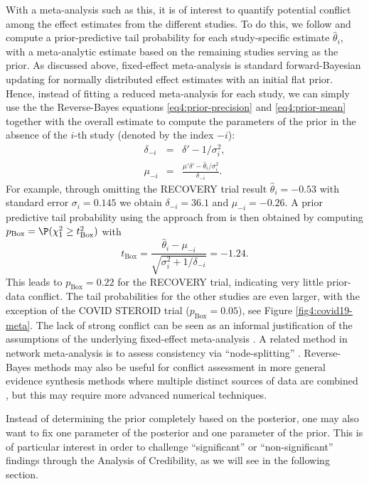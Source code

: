 With a meta-analysis such as this, it is of interest to quantify potential
conflict among the effect estimates from the different studies. To do this, we
follow \citet{Presanis2013} and compute a prior-predictive tail probability
\citep{Box1980, Evans2006} for each study-specific estimate $\hat \theta_i$,
with a meta-analytic estimate based on the remaining studies serving as the
prior. As discussed above, fixed-effect meta-analysis is standard
forward-Bayesian updating for normally distributed effect estimates with an
initial flat prior. Hence, instead of fitting a reduced meta-analysis for each
study, we can simply use the the Reverse-Bayes equations
\eqref{eq4:prior-precision} and \eqref{eq4:prior-mean} together with the overall
estimate to compute the parameters of the prior in the absence of the $i$-th
study (denoted by the index $-i$):
\begin{eqnarray*}
\delta_{-i} & = & \delta' - 1/\sigma_i^2, \\
\mu_{-i} & = & \frac{ \mu' \delta' - \hat \theta_i / \sigma_i^2}{\delta_{-i}}.
\end{eqnarray*}
For example, through omitting the RECOVERY trial result $\hat{\theta}_i = -0.53$
with standard error ${\sigma}_i = 0.145$ we obtain $\delta_{-i} = 36.1$ and
$\mu_{-i} = -0.26$. A prior predictive tail probability using the approach from
\citet{Box1980} is then obtained by computing
$p_{\text{Box}} = \P(\chi^2_1 \geq t^2_{\text{Box}})$ with
$$
t_{\text{Box}} = \frac{\hat \theta_i - \mu_{-i}}{\sqrt{\sigma_i^2 + 1/\delta_{-i}}} =-1.24.$$
This leads to $p_{\text{Box}} = 0.22$ for the RECOVERY trial, indicating very
little prior-data conflict. The tail probabilities for the other studies are
even larger, with the exception of the COVID STEROID trial
($p_{\text{Box}}=0.05$), see Figure \ref{fig4:covid19-meta}. The lack of strong
conflict can be seen as an informal justification of the assumptions of the
underlying fixed-effect meta-analysis \citep{Presanis2013,Ferkingstad2017}. A
related method in network meta-analysis is to assess consistency via
``node-splitting'' \citep{Dias2010}. Reverse-Bayes methods may also be useful
for conflict assessment in more general evidence synthesis methods where
multiple distinct sources of data are combined \citep{Goodie2019,Cunen2021}, but
this may require more advanced numerical techniques.




Instead of determining the prior completely based on the posterior, one may also
want to fix one parameter of the posterior and one parameter of the prior. This
is of particular interest in order to challenge ``significant'' or
``non-significant'' findings through the Analysis of Credibility, as we will see
in the following section.


